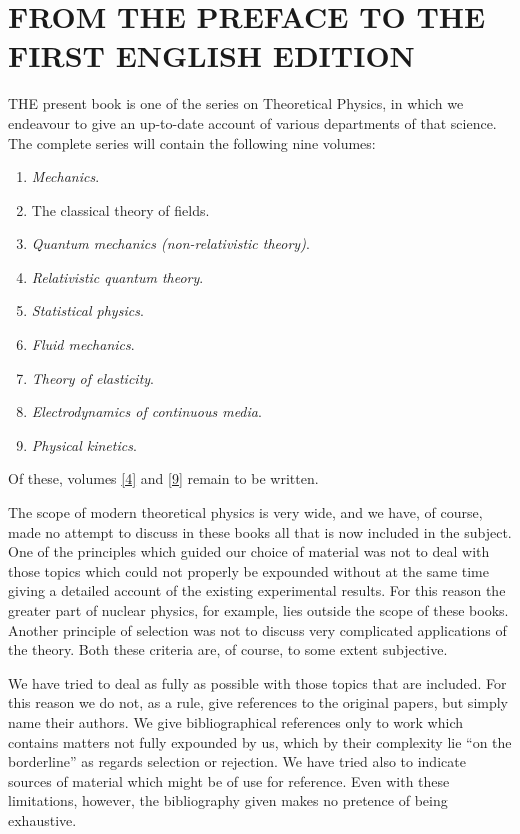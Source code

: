 \chapter{FROM THE PREFACE TO THE FIRST ENGLISH EDITION}
THE present book is one of the series on Theoretical Physics, in which we endeavour to give an up-to-date account of various departments of that science. The complete series will contain the following nine volumes:
\begin{enumerate}
	\item \textit{Mechanics}.\label{1}
	\item The classical theory of fields.\label{2}
	\item \textit{Quantum mechanics (non-relativistic theory)}.\label{3}
	\item \textit{Relativistic quantum theory}.\label{4}
	\item \textit{Statistical physics}.\label{5}
	\item \textit{Fluid mechanics}.\label{6}
	\item \textit{Theory of elasticity}.\label{7}
	\item \textit{Electrodynamics of continuous media}.\label{8}
	\item \textit{Physical kinetics}.\label{9}
\end{enumerate}

Of these, volumes \ref{4} and \ref{9} remain to be written.

The scope of modern theoretical physics is very wide, and we have, of course, made no attempt to discuss in these books all that is now included in the subject. One of the principles which guided our choice of material was not to deal with those topics which could not properly be expounded without at the same time giving a detailed account of the existing experimental results. For this reason the greater part of nuclear physics, for example, lies outside the scope of these books. Another principle of selection was not to discuss very complicated applications of the theory. Both these criteria are, of course, to some extent subjective.

We have tried to deal as fully as possible with those topics that are included. For this reason we do not, as a rule, give references to the original papers, but simply name their authors. We give bibliographical references only to work which contains matters not fully expounded by us, which by their complexity lie “on the borderline” as regards selection or rejection. We have tried also to indicate sources of material which might be of use for reference. Even with these limitations, however, the bibliography given makes no pretence of being exhaustive.

